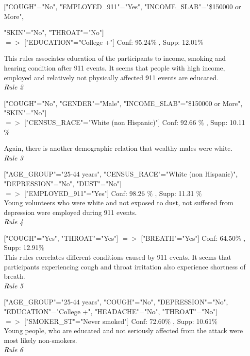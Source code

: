 \documentclass[11pt]{article}
\begin{document}
["COUGH"="No", "EMPLOYED\_911"="Yes", "INCOME\_SLAB"="\$150000 or More", 

"SKIN"="No", "THROAT"="No"] \\ 
$=>$ ["EDUCATION"="College +"] Conf: 95.24\% , Supp: 12.01\%  

This rules associates education of the participants to income, smoking and hearing condition after 911 events. It seems that people with high income, employed and
relatively not physically affected 911 events are educated. \\

\textit{Rule 2}

["COUGH"="No", "GENDER"="Male", "INCOME\_SLAB"="\$150000 or More", "SKIN"="No"] \\
$=>$ ["CENSUS\_RACE"="White (non Hispanic)"] Conf: 92.66 \% , Supp: 10.11 \% 

Again, there is another demographic relation that wealthy males were white. \\

\textit{Rule 3}

["AGE\_GROUP"="25-44 years", "CENSUS\_RACE"="White (non Hispanic)", "DEPRESSION"="No", "DUST"="No"]\\
 $=>$ ["EMPLOYED\_911"="Yes"] Conf: 98.26 \% , Supp: 11.31 \%  \\

Young volunteers who were white and not exposed to dust, not suffered from depression were employed during 911 events. \\

\textit{Rule 4}

["COUGH"="Yes", "THROAT"="Yes"] $=>$ ["BREATH"="Yes"] Conf: 64.50\% , Supp: 12.91\%  \\

This rules correlates different conditions caused by 911 events. It seems that participants experiencing cough and throat irritation also experience shortness of breath.\\

\textit{Rule 5}

["AGE\_GROUP"="25-44 years", "COUGH"="No", "DEPRESSION"="No", "EDUCATION"="College +", "HEADACHE"="No", "THROAT"="No"]\\
$=>$ ["SMOKER\_ST"="Never smoked"] Conf: 72.60\% , Supp: 10.61\%  \\

Young people, who are educated and not seriously affected from the attack were most likely non-smokers.\\
\textit{Rule 6}
\end{document}
